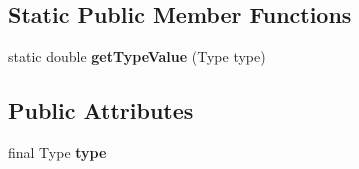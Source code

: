 \subsection*{Static Public Member Functions}
\begin{DoxyCompactItemize}
\item 
static double {\bfseries get\+Type\+Value} (Type type)\hypertarget{classuniverse_1_1_resource_a5653128bf27f550a12c76fb48eb5e4f0}{}\label{classuniverse_1_1_resource_a5653128bf27f550a12c76fb48eb5e4f0}

\end{DoxyCompactItemize}
\subsection*{Public Attributes}
\begin{DoxyCompactItemize}
\item 
final Type {\bfseries type}\hypertarget{classuniverse_1_1_resource_ae725dce2a3db464dd2f951093bf8fbb6}{}\label{classuniverse_1_1_resource_ae725dce2a3db464dd2f951093bf8fbb6}

\end{DoxyCompactItemize}
